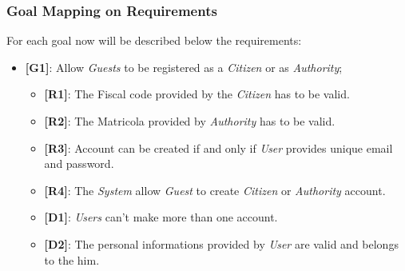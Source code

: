 \documentclass{article}
\begin{document}
\subsubsection{Goal Mapping on Requirements}
For each goal now will be described below the requirements:
\begin{itemize}
    \item \textbf{[G1]}: Allow \textit{Guests} to be registered as a \textit{Citizen} or as \textit{Authority};
    \begin{itemize}
        \item \textbf{[R1]}: The Fiscal code provided by the \textit{Citizen} has to be valid.
        \item \textbf{[R2]}: The Matricola provided by \textit{Authority} has to be valid.
        \item \textbf{[R3]}: Account can be created if and only if \textit{User} provides unique email and password.
        \item \textbf{[R4]}: The \textit{System} allow \textit{Guest} to create \textit{Citizen} or \textit{Authority} account.
        \item \textbf{[D1]}: \textit{Users} can't make more than one account.
        \item \textbf{[D2]}: The personal informations provided by \textit{User} are valid and belongs to the him. 
    \end{itemize}


\end{itemize}
\end{document}
